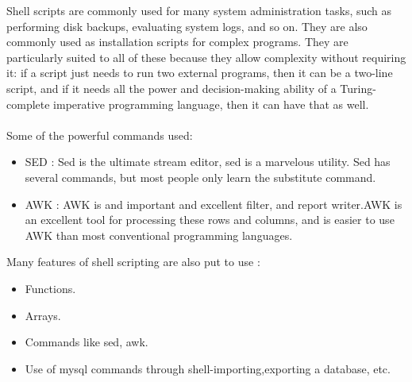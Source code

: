 Shell scripts are commonly used for many system administration tasks, such as performing disk backups, evaluating system logs, and so on. They are also commonly used as installation scripts for complex programs. They are particularly suited to all of these because they allow complexity without requiring it: if a script just needs to run two external programs, then it can be a two-line script, and if it needs all the power and decision-making ability of a Turing-complete imperative programming language, then it can have that as well.\\\\
Some of the powerful commands used:
\begin{itemize}
\item SED : Sed is the ultimate stream editor, sed is a marvelous utility. Sed has several commands, but most people only learn the substitute command.
\item AWK : AWK is and important and excellent filter, and report writer.AWK is an excellent tool for processing these rows and columns, and is easier to use AWK than most conventional programming languages.
\end{itemize}
\newpage
Many features of shell scripting are also put to use :
\begin{itemize}
\item Functions.
\item Arrays.
\item Commands like sed, awk.
\item Use of mysql commands through shell-importing,exporting a database, etc.
\end{itemize}
\newpage

